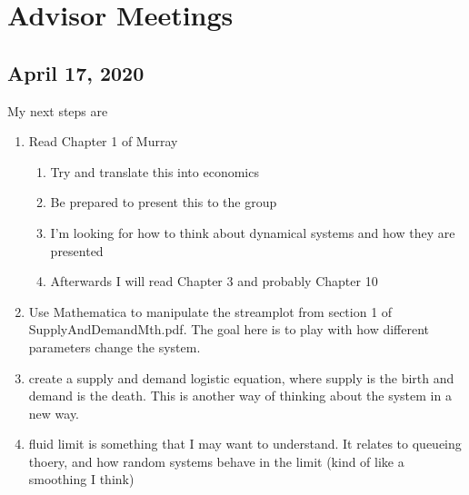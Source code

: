 \documentclass{article}
\begin{document}
\section{Advisor Meetings}
\subsection{April 17, 2020}
My next steps are 
\begin{enumerate}
	\item Read Chapter 1 of Murray
	\begin{enumerate}
		\item Try and translate this into economics
		\item Be prepared to present this to the group
		\item I'm looking for how to think about dynamical systems and how they are presented
	  \item Afterwards I will read Chapter 3 and probably Chapter 10
	\end{enumerate}
	\item Use Mathematica to manipulate the streamplot from section 1 of SupplyAndDemandMth.pdf. The goal here is to play with how different parameters change the system. 
	\item create a supply and demand logistic equation, where supply is the birth and demand is the death. This is another way of thinking about the system in a new way.
	\item fluid limit is something that I may want to understand. It relates to queueing thoery, and how random systems behave in the limit (kind of like a smoothing I think)
\end{enumerate} 
\end{document}
